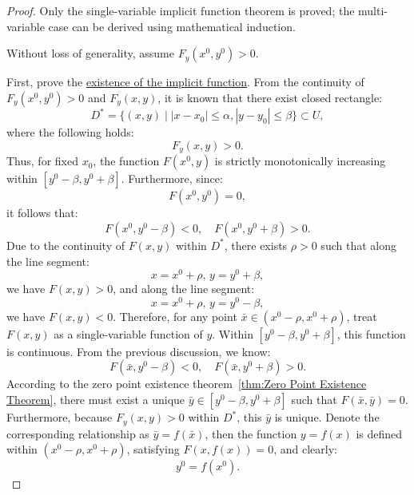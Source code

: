 \documentclass[11pt]{../../TexTemplate/elegantbook}
\begin{document}
\begin{proof}
    Only the single-variable implicit function theorem is proved; 
    the multi-variable case can be derived using mathematical induction.
    
    Without loss of generality, assume \(F_y(x^0, y^0) > 0\).

    First, prove the \underline{existence of the implicit function}.  
    From the continuity of \(F_y(x^{0}, y^{0}) > 0\) and \(F_y(x, y)\), 
    it is known that there exist closed rectangle:
    \[
    D^* = \{(x, y) \mid |x - x_0| \leqslant \alpha, |y - y_0| \leqslant \beta\} \subset U,
    \]
    where the following holds:
    \[
    F_y(x, y) > 0.
    \]
    Thus, for fixed \(x_0\), the function \(F(x^{0}, y)\) is strictly monotonically increasing 
    within \([y^{0} - \beta, y^{0} + \beta]\). Furthermore, since:
    \[
    F(x^{0}, y^{0}) = 0,
    \]
    it follows that:
    \[
    F(x^{0}, y^{0} - \beta) < 0, \quad F(x^{0}, y^{0} + \beta) > 0.
    \]
    Due to the continuity of \(F(x, y)\) within \(D^*\), there exists \(\rho > 0\) such that along the line segment:
    \[
    x = x^{0} + \rho, \, y = y^{0} + \beta,
    \]
    we have \(F(x, y) > 0\), and along the line segment:
    \[
    x = x^{0} + \rho, \, y = y^{0} - \beta,
    \]
    we have \(F(x, y) < 0\).
    Therefore, for any point \(\bar{x} \in (x^{0} - \rho, x^{0} + \rho)\), treat \(F(x, y)\) as a single-variable function of \(y\). 
    Within \([y^{0} - \beta, y^{0} + \beta]\), this function is continuous. From the previous discussion, we know:
    \[
    F(\bar{x}, y^{0} - \beta) < 0, \quad F(\bar{x}, y^{0} + \beta) > 0.
    \]
    According to the zero point existence theorem~\ref{thm:Zero Point Existence Theorem}, 
    there must exist a unique \(\bar{y} \in [y^{0} - \beta, y^{0} + \beta]\) 
    such that \(F(\bar{x}, \bar{y}) = 0\). 
    Furthermore, because \(F_y(x, y) > 0\) within \(D^*\), this \(\bar{y}\) is unique.
    Denote the corresponding relationship as \(\bar{y} = f(\bar{x})\), 
    then the function \(y = f(x)\) is defined within \((x^{0} - \rho, x^{0} + \rho)\), 
    satisfying \(F(x, f(x)) = 0\), and clearly:
    \[
    y^{0} = f(x^{0}).
    \]


\end{proof}
\end{document}

